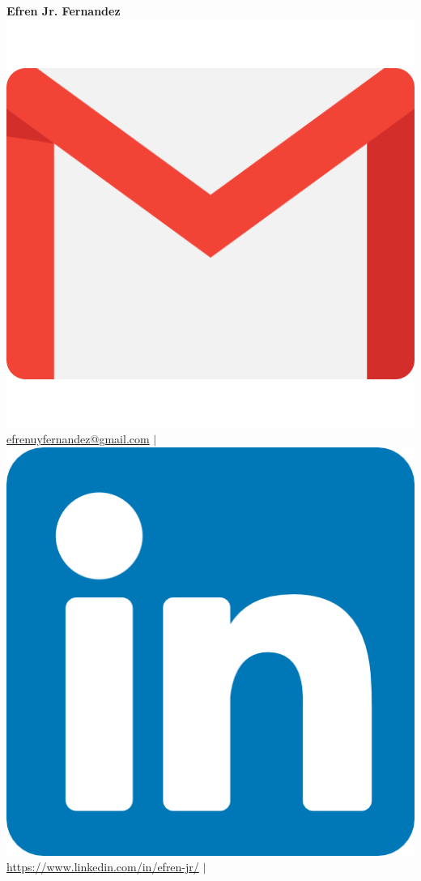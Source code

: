 \documentclass[a4paper,20pt]{article}
\begin{document}
\begin{center}
    {\huge \textbf{Efren Jr. Fernandez}} \vspace{5pt}\\ %
    \includegraphics[scale = 0.02]{images/Gmail_icon_(2020).png} \href{mailto:}{efrenuyfernandez@gmail.com} $\vert$
    \includegraphics[scale = 0.02]{images/linkedin_logo.png} \href{https://www.linkedin.com/in/efren-jr/}{https://www.linkedin.com/in/efren-jr/} $\vert$ 

\end{center}
\end{document}
